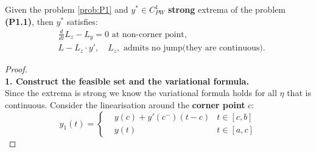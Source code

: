 \begin{theorem}
	Given the problem \eqref{prob:P1} and $y^* \in  C^1_{PW}$ \textbf{strong} extrema of the problem \textbf{(P1.1)}, then $y^*$ satisfies:
	\begin{equation}
	\begin{aligned}
		& \frac{d}{dt} L_z - L_y = 0 \text{ at non-corner point,} \\
		& L - L_z \cdot y',  \quad  L_z,  \text{ admits no jump(they are continuous).}
	\end{aligned}
	\end{equation}
\end{theorem}
\begin{proof}
\quad\\
\textbf{1. Construct the feasible set and the variational formula.}\\
Since the extrema is strong we know the variational formula holds for all $\eta$ that is continuous.  Consider the linearisation around the \textbf{corner point} $c$:
\begin{equation*}
y_1(t)=\left\{
\begin{aligned}
	 & y(c) + y'(c^-)(t - c) &t \in [c, b]\\
	 & y(t) &t \in [a, c]	
\end{aligned}
\right.
\end{equation*}


\end{proof}
